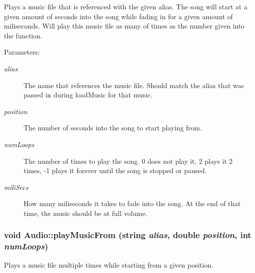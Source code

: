 Plays a music file that is referenced with the given alias. The song will start at a given amount of seconds into the song while fading in for a given amount of miliseconds. Will play this music file as many of times as the number given into the function. \begin{Desc}
\item[Parameters:]
\begin{description}
\item[{\em alias}]The name that references the music file. Should match the alias that was passed in during loadMusic for that music. \item[{\em position}]The number of seconds into the song to start playing from. \item[{\em numLoops}]The number of times to play the song. 0 does not play it, 2 plays it 2 times, -1 plays it forever until the song is stopped or paused. \item[{\em miliSecs}]How many miliseconds it takes to fade into the song. At the end of that time, the music should be at full volume. \end{description}
\end{Desc}
\hypertarget{class_audio_c2b309bce1a1ffe3560f34a8a6027597}{
\subsubsection[{playMusicFrom}]{\setlength{\rightskip}{0pt plus 5cm}void Audio::playMusicFrom (string {\em alias}, \/  double {\em position}, \/  int {\em numLoops})}}
\label{class_audio_c2b309bce1a1ffe3560f34a8a6027597}


Plays a music file multiple times while starting from a given position. 

